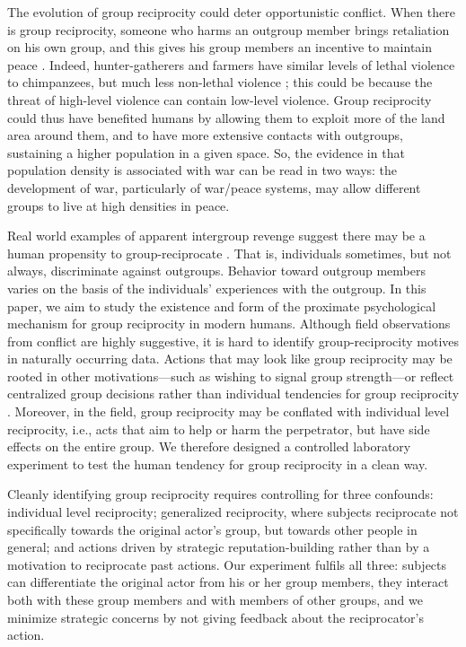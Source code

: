 \documentclass[12pt,a4paper]{article}\usepackage[]{graphicx}\usepackage[]{color}
\begin{document}
The evolution of group 
reciprocity could deter opportunistic conflict. When there is group reciprocity, someone who harms an outgroup member 
brings retaliation on his own group, and this gives his group members an incentive to maintain peace 
\citep{boehm1984blood,fearon1996explaining}. Indeed, hunter-gatherers and farmers have similar levels of
lethal violence to chimpanzees, but much less non-lethal violence \citep{wrangham2006comparative}; this could be
because the threat of high-level violence can contain low-level violence. Group reciprocity could thus 
have benefited humans by allowing them to exploit more of the land area 
around them, and to have more extensive contacts with outgroups, sustaining
a higher population in a given space. So, the evidence in \citet{kelly2000warless} that population 
density is associated with war can be read in two ways: the development of war, particularly of war/peace systems, may 
allow different groups to live at high densities in peace.  

Real world examples of apparent intergroup revenge suggest there may be a human propensity to group-reciprocate \citep{horowitz1985ethnicgroups,horowitz2001thedeadly,bauerlein2001negrophobia,chagnon1988lifehistories}.
That is, individuals sometimes, but not always, discriminate against outgroups. Behavior toward outgroup members varies on the basis of the individuals' experiences with the outgroup.
In this paper, we aim to study the existence and form of the proximate
psychological mechanism for group reciprocity in modern humans. Although field observations from conflict are highly 
suggestive, it is hard to identify group-reciprocity motives in naturally occurring data. Actions that may look like group reciprocity may be rooted in other motivations---such as wishing to signal group strength---or reflect centralized group decisions rather than individual tendencies for group reciprocity \citep{gould2000revenge,mamdani2001victims}.
Moreover, in the field, group 
reciprocity may be conflated with individual level reciprocity, i.e., acts that aim to help or harm the perpetrator, but have side effects on the entire group. We therefore designed a controlled laboratory experiment to test the human tendency for group reciprocity in a clean way. 

Cleanly identifying group reciprocity requires controlling for three confounds: individual level reciprocity; generalized reciprocity,
where subjects reciprocate not specifically towards the original actor’s group, but towards other people in general; and
actions driven by strategic reputation-building rather than by a motivation to reciprocate past actions. 
Our experiment fulfils all three: subjects can differentiate the original actor from his or her group members, they 
interact both with these group members and with members of other groups, and we minimize strategic concerns by not giving feedback about the reciprocator's action.
\end{document}
